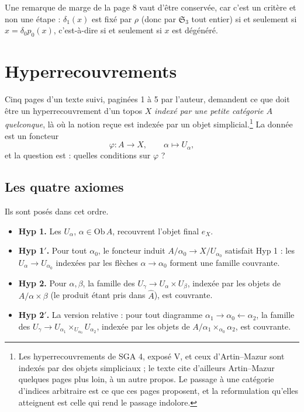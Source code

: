 \documentclass[11pt,a4paper]{article}
\begin{document}
Une remarque de marge de la page 8 vaut d'être conservée, car c'est un critère
et non une étape : $\delta_{1}(x)$ est fixé par $\rho$ (donc par
$\mathfrak{S}_{3}$ tout entier) si et seulement si $x = \delta_{0}p_{0}(x)$,
c'est-à-dire si et seulement si $x$ est dégénéré.

\section*{Hyperrecouvrements}

Cinq pages d'un texte suivi, paginées 1 à 5 par l'auteur, demandent ce que doit
être un hyperrecouvrement d'un topos $X$ \emph{indexé par une petite catégorie
$A$ quelconque}, là où la notion reçue est indexée par un objet
simplicial.\footnote{Les hyperrecouvrements de SGA 4, exposé V, et ceux
d'Artin--Mazur sont indexés par des objets simpliciaux ; le texte cite d'ailleurs
Artin--Mazur quelques pages plus loin, à un autre propos. Le passage à une
catégorie d'indices arbitraire est ce que ces pages proposent, et la
reformulation qu'elles atteignent est celle qui rend le passage indolore.}
La donnée est un foncteur
\[
  \varphi \colon A \longrightarrow X, \qquad \alpha \longmapsto U_{\alpha},
\]
et la question est : quelles conditions sur $\varphi$ ?

\subsection*{Les quatre axiomes}

Ils sont posés dans cet ordre.

\begin{itemize}
\item \textbf{Hyp 1.} Les $U_{\alpha}$, $\alpha \in \mathrm{Ob}\,A$, recouvrent
l'objet final $e_{X}$.
\item \textbf{Hyp 1${}'$.} Pour tout $\alpha_{0}$, le foncteur induit
$A/\alpha_{0} \to X/U_{\alpha_{0}}$ satisfait Hyp 1 : les
$U_{\alpha} \to U_{\alpha_{0}}$ indexées par les flèches $\alpha \to
\alpha_{0}$ forment une famille couvrante.
\item \textbf{Hyp 2.} Pour $\alpha, \beta$, la famille des
$U_{\gamma} \to U_{\alpha} \times U_{\beta}$, indexée par les objets de
$A/\alpha\times\beta$ (le produit étant pris dans $\widehat{A}$), est
couvrante.
\item \textbf{Hyp 2${}'$.} La version relative : pour tout diagramme
$\alpha_{1} \to \alpha_{0} \leftarrow \alpha_{2}$, la famille des
$U_{\gamma} \to U_{\alpha_{1}} \times_{U_{\alpha_{0}}} U_{\alpha_{2}}$,
indexée par les objets de $A/\alpha_{1}\times_{\alpha_{0}}\alpha_{2}$, est
couvrante.
\end{itemize}
\end{document}
